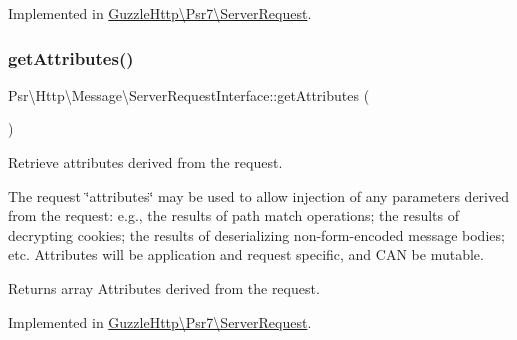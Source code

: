 Implemented in \hyperlink{classGuzzleHttp_1_1Psr7_1_1ServerRequest_a92cc29d8e646a36435d09488e82c2ed9}{Guzzle\+Http\textbackslash{}\+Psr7\textbackslash{}\+Server\+Request}.

\mbox{\label{interfacePsr_1_1Http_1_1Message_1_1ServerRequestInterface_a0cda25a9b297c86e7813ffcb98ceb3df}} 
\subsubsection{\texorpdfstring{get\+Attributes()}{getAttributes()}}
{\footnotesize\ttfamily Psr\textbackslash{}\+Http\textbackslash{}\+Message\textbackslash{}\+Server\+Request\+Interface\+::get\+Attributes (\begin{DoxyParamCaption}{ }\end{DoxyParamCaption})}

Retrieve attributes derived from the request.

The request \char`\"{}attributes\char`\"{} may be used to allow injection of any parameters derived from the request\+: e.\+g., the results of path match operations; the results of decrypting cookies; the results of deserializing non-\/form-\/encoded message bodies; etc. Attributes will be application and request specific, and C\+AN be mutable.

\begin{DoxyReturn}{Returns}
array Attributes derived from the request. 
\end{DoxyReturn}


Implemented in \hyperlink{classGuzzleHttp_1_1Psr7_1_1ServerRequest_a0c55ac2643aa033868e1780ffa5456a7}{Guzzle\+Http\textbackslash{}\+Psr7\textbackslash{}\+Server\+Request}.

\mbox{\label{interfacePsr_1_1Http_1_1Message_1_1ServerRequestInterface_ab9ba930a8a2d62d54213dc07334fc379}} 
